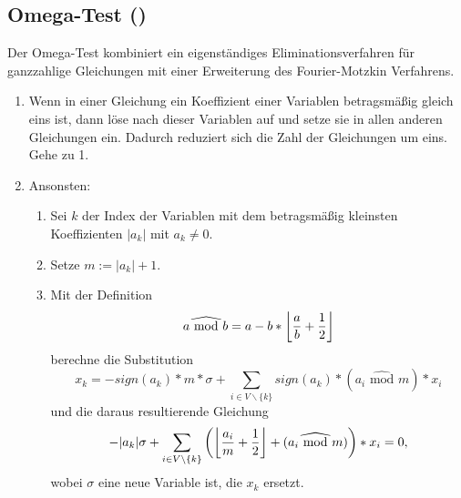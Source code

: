 \subsection{Omega-Test (\cite{Pugh95a})}

\def\MOD{\widehat{\textrm{\ mod\ }}}
Der Omega-Test kombiniert ein eigenständiges Eliminationsverfahren für
ganzzahlige Gleichungen mit einer Erweiterung des Fourier-Motzkin
Verfahrens. 

\begin{enumerate}
\item Wenn in einer Gleichung ein Koeffizient einer Variablen
  betragsmäßig gleich eins ist, dann löse nach dieser Variablen auf
  und setze sie in allen anderen Gleichungen ein. Dadurch reduziert
  sich die Zahl der Gleichungen um eins. Gehe zu 1.
\item Ansonsten: 
  \begin{enumerate}
  \item Sei $k$ der Index der Variablen mit dem betragsmäßig kleinsten
    Koeffizienten $|a_k|$ mit $a_k\not=0$.
  \item Setze $m:= |a_k|+1$.
  \item Mit der Definition $$a\MOD b = a - b *
    \left\lfloor {a\over b} + {1 \over 2}\right \rfloor$$
    berechne die Substitution $$x_k = -sign(a_k)*m*\sigma +
    \sum_{i\in V\backslash\{k\}} sign(a_k)*(a_i \MOD m) * x_i$$
    und die daraus resultierende Gleichung
    $$-|a_k|\sigma + \sum_{i\in V\backslash\{k\}}\left(\left\lfloor{a_i\over
        m} + {1\over 2}\right\rfloor + (a_i\MOD m)\right) * x_i = 0,$$
    wobei $\sigma$ eine neue Variable ist, die $x_k$ ersetzt.
    

\end{enumerate}
\end{enumerate}
